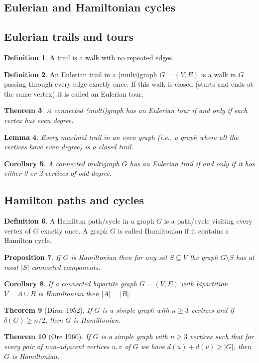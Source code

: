 \documentclass[10pt, fleqn, a4paper, landscape]{article}
\theoremstyle{plain} %
\newtheorem{thm}{Theorem}
\newtheorem{lem}[thm]{Lemma}
\newtheorem{pro}[thm]{Proposition}
\newtheorem{cor}[thm]{Corollary}
\theoremstyle{remark} %
\theoremstyle{definition} %
\newtheorem{defi}[thm]{Definition}
\begin{document}
\begin{multicols}{3}
\begin{tiny}
\section{Eulerian and Hamiltonian cycles}
\subsection{Eulerian trails and tours}
\addtocounter{thm}{1}
\begin{defi}
A trail is a walk with no repeated edges.
\end{defi}

\begin{defi}
An Eulerian trail in a (multi)graph $G = (V,E)$ is a walk in $G$ passing through every edge exactly once. If this walk is closed (starts and ends at the same vertex) it is called an Eulerian tour.
\end{defi}
\addtocounter{thm}{1}
\begin{thm}
A connected (multi)graph has an Eulerian tour if and only if each vertex has even degree.
\end{thm}

\begin{lem}
Every maximal trail in an even graph (i.e., a graph where all the vertices have even degree) is a closed trail.
\end{lem} 

\begin{cor}
A connected multigraph $G$ has an Eulerian trail if and only if it has either 0 or 2 vertices of odd degree.
\end{cor}

\subsection{Hamilton paths and cycles}
\begin{defi}
A Hamilton path/cycle in a graph $G$ is a path/cycle visiting every vertex of $G$ exactly once. A graph $G$ is called Hamiltonian if it contains a Hamilton cycle.
\end{defi}
\addtocounter{thm}{1}
\begin{pro}
If $G$ is Hamiltonian then for any set $S \subseteq V$ the graph $G\setminus S$ has at most $|S|$ connected components.
\end{pro}

\begin{cor}
If a connected bipartite graph $G = (V,E)$ with bipartition $V = A\cup B$ is Hamiltonian then $|A|=|B|$.
\end{cor}
\addtocounter{thm}{1}
\begin{thm}[Dirac 1952]
If $G$ is a simple graph with $n \ge 3$ vertices and if $\delta(G) \ge n/2$, then $G$ is Hamiltonian.
\end{thm}
\addtocounter{thm}{1}
\begin{thm}[Ore 1960]
If $G$ is a simple graph with $n\ge 3$ vertices such that for every pair of
non-adjacent vertices $u, v$ of $G$ we have $d(u) + d(v)\ge |G|$, then $G $ is Hamiltonian.
\end{thm}

\end{tiny}
\end{multicols}
\end{document}
